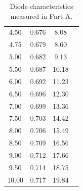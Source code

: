\documentclass{article}
\begin{document}
\begin{table}[hbtp]
\begin{subtable}[t]{0.5\textwidth}
\begin{tabular}{cccc}
      4.50 & 0.676 & 8.08 \\
      4.75 & 0.679 & 8.60 \\
      5.00 & 0.682 & 9.13 \\
      5.50 & 0.687 & 10.18 \\
      6.00 & 0.692 & 11.23 \\
      6.50 & 0.696 & 12.30 \\
      7.00 & 0.699 & 13.36 \\
      7.50 & 0.703 & 14.42 \\
      8.00 & 0.706 & 15.49 \\
      8.50 & 0.709 & 16.56 \\
      9.00 & 0.712 & 17.66 \\
      9.50 & 0.714 & 18.75 \\
      10.00 & 0.717 & 19.84 \\
    \end{tabular}
  \end{subtable}
  \caption{\label{tab:part_a} Diode characteristics measured in Part A.}
\end{table}
\end{document}
